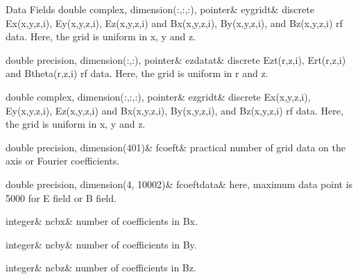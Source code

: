 \begin{DoxyFields}{Data Fields}
\mbox{\label{namespacedataclass_a639f6d59caf105d71786b5af143f5e00}} 
double complex, dimension(:,:,:), pointer&
eygridt&
discrete Ex(x,y,z,i), Ey(x,y,z,i), Ez(x,y,z,i) and Bx(x,y,z,i), By(x,y,z,i), and Bz(x,y,z,i) rf data. Here, the grid is uniform in x, y and z. \\
\hline

\mbox{\label{namespacedataclass_a117a66a64c471555f76b60475a5eb749}} 
double precision, dimension(:,:), pointer&
ezdatat&
discrete Ezt(r,z,i), Ert(r,z,i) and Btheta(r,z,i) rf data. Here, the grid is uniform in r and z. \\
\hline

\mbox{\label{namespacedataclass_a2df20efd300756cc323b7e2cd58ca1b3}} 
double complex, dimension(:,:,:), pointer&
ezgridt&
discrete Ex(x,y,z,i), Ey(x,y,z,i), Ez(x,y,z,i) and Bx(x,y,z,i), By(x,y,z,i), and Bz(x,y,z,i) rf data. Here, the grid is uniform in x, y and z. \\
\hline

\mbox{\label{namespacedataclass_a5225985a5539f3faa0647566e1422248}} 
double precision, dimension(401)&
fcoeft&
practical number of grid data on the axis or Fourier coefficients. \\
\hline

\mbox{\label{namespacedataclass_a79c88db5f53e7b262d5235a48d82e48a}} 
double precision, dimension(4, 10002)&
fcoeftdata&
here, maximum data point is 5000 for E field or B field. \\
\hline

\mbox{\label{namespacedataclass_a37ffb6adb65210dfd042477d255254e2}} 
integer&
ncbx&
number of coefficients in Bx. \\
\hline

\mbox{\label{namespacedataclass_ac1e45e629c42014acf508271aedce0e0}} 
integer&
ncby&
number of coefficients in By. \\
\hline

\mbox{\label{namespacedataclass_a54e28e2886fb385cf7e33132b1085d5d}} 
integer&
ncbz&
number of coefficients in Bz. \\
\hline


\end{DoxyFields}
